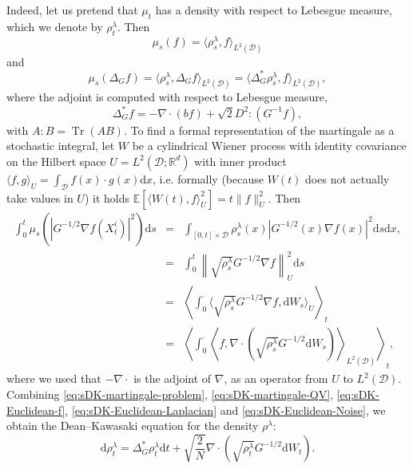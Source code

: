 \documentclass[11pt, a4paper]{article}
\newcommand{\cdummy}{\cdot}
\newcommand{\mathd}{\mathrm{d}}
\begin{document}
Indeed, let us pretend that $\mu_t$ has a density with respect to Lebesgue measure,
which we denote by $\rho^\lambda_t$. Then
\begin{equation}\label{eq:sDK-Euclidean-f}
    \mu_s(f) = \langle \rho^\lambda_s, f\rangle_{L^2(\mathcal{D})}
\end{equation}
 and
\begin{equation}\label{eq:sDK-Euclidean-Laplacian}
    \mu_s(\Delta_G f) = \langle \rho^\lambda_s, \Delta_G f\rangle_{L^2(\mathcal{D})} = \langle \Delta_G^\ast \rho^\lambda_s, f\rangle_{L^2(\mathcal{D})} ,
\end{equation}
where the adjoint is computed with respect to Lebesgue measure, 
\begin{equation*}
    \Delta_G^{\ast} f = - \nabla \cdummy (b f) + \sqrt{2} D^2 : (G^{- 1} f),
\end{equation*}
with $A:B = \operatorname{Tr}(AB)$. To find a formal representation of the martingale as a stochastic integral, let $W$ be a cylindrical Wiener process with identity covariance on the Hilbert space $U=L^2(\mathcal{D}; \mathbb R^d)$ with inner product $\langle f, g\rangle_U = \int_{\mathcal{D}} f(x) \cdot g(x) \mathd x$, i.e. formally (because $W(t)$ does not actually take values in $U$) it holds $\mathbb E[\langle W(t), f\rangle_U^2] = t \| f\|_U^2$. Then
\begin{eqnarray}\nonumber
  \int_0^t \mu_s (| G^{- 1 / 2} \nabla f (X^i_t) |^2) \mathd s & = & \int_{[0, t]
  \times \mathcal{D}} \rho^{\lambda}_s(x) | G^{- 1 / 2}(x) \nabla f(x) |^2 \mathd s \mathd x,\\ \nonumber
  & = & \int_{0}^t \left\| \sqrt{\rho^{\lambda}_s} G^{- 1 / 2}
  \nabla f \right\|_U^2 \mathd s\\ \nonumber
  & = & \left\langle \int_{0}^\cdot \langle \sqrt{\rho^{\lambda}_s} G^{- 1 / 2}
  \nabla f, \mathd W_s\rangle_U\right\rangle_t\\
  & = & \left\langle \int_{0}^\cdot \left\langle f, \nabla \cdot (\sqrt{\rho^{\lambda}_s} G^{- 1 / 2}\mathd W_s)\right\rangle_{L^2(\mathcal{D})}\right\rangle_t, \label{eq:sDK-Euclidean-Noise}
\end{eqnarray}
where we used that $-\nabla\cdot$ is the adjoint of $\nabla$, as an operator from $U$ to $L^2(\mathcal{D})$.
Combining \eqref{eq:sDK-martingale-problem}, \eqref{eq:sDK-martingale-QV}, \eqref{eq:sDK-Euclidean-f}, \eqref{eq:sDK-Euclidean-Laplacian} and \eqref{eq:sDK-Euclidean-Noise}, we   obtain the Dean--Kawasaki equation for the density $\rho^\lambda$:
\begin{equation}\label{eq:sDK-Euclidean}
    \mathd \rho^\lambda_t = \Delta_G^{\ast} \rho^\lambda_t \mathd t +
   \sqrt{\frac{2}{N}} \nabla \cdummy \left( \sqrt{\rho^\lambda_t} G^{- 1 /
   2} \mathd W_t \right).
\end{equation}
\end{document}
